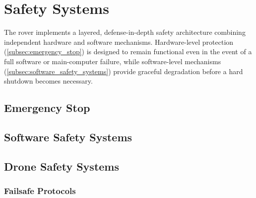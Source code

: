 %
%
%

\section{Safety Systems}
\label{sec:safety}

The rover implements a layered, defense-in-depth safety architecture
combining independent hardware and software mechanisms. Hardware-level
protection (\autoref{subsec:emergency_stop}) is designed to remain functional
even in the event of a full software or main-computer failure, while
software-level mechanisms (\autoref{subsec:software_safety_systems}) provide graceful
degradation before a hard shutdown becomes necessary.

\subsection{Emergency Stop}
\label{subsec:emergency_stop}


\subsection{Software Safety Systems}
\label{subsec:software_safety_systems}


\subsection{Drone Safety Systems}
\label{subsec:drone_safety_systems}

\subsubsection{Failsafe Protocols}
\label{subsubsec:drone_failsafe_protocols}

